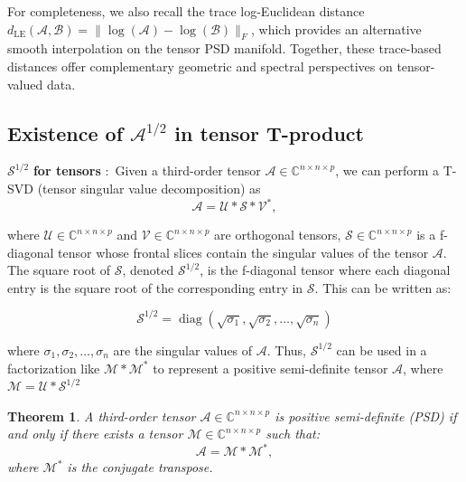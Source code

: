 \documentclass[oupthm]{CUP-JNL-BCM}%
\theoremstyle{oupplain}
\newtheorem{theorem}{Theorem}[section]
\theoremstyle{oupdefinition}
\theoremstyle{oupremark}
\theoremstyle{oupproof}
\numberwithin{equation}{section}
\begin{document}
For completeness, we also recall the trace log-Euclidean distance
$d_{\mathrm{LE}}(\mathcal{A},\mathcal{B})=\|\log(\mathcal{A})-\log(\mathcal{B})\|_F$,
which provides an alternative smooth interpolation on the tensor PSD manifold.
Together, these trace-based distances offer complementary geometric and spectral
perspectives on tensor-valued data.




\subsection{Existence of $\mathcal{A}^{1/2}$ in tensor T-product}

$\mathcal{S}^{1 / 2}$ \textbf{for tensors} \cite{ahalf}:~Given a third-order tensor $\mathcal{A} \in \mathbb{C}^{n \times n \times p}$, we can perform a T-SVD (tensor singular value decomposition) as
\begin{equation*}
    \mathcal{A}=\mathcal{U} * \mathcal{S} * \mathcal{V}^*,
\end{equation*}

\noindent where $\mathcal{U} \in \mathbb{C}^{n \times n \times p}$ and $\mathcal{V} \in \mathbb{C}^{n \times n \times p}$ are orthogonal tensors, $\mathcal{S} \in \mathbb{C}^{n \times n \times p}$ is a f-diagonal tensor whose frontal slices contain the singular values of the tensor $\mathcal{A}$.\\

\noindent The square root of $\mathcal{S}$, denoted $\mathcal{S}^{1 / 2}$, is the f-diagonal tensor where each diagonal entry is the square root of the corresponding entry in $\mathcal{S}$. This can be written as:

$$
\mathcal{S}^{1 / 2}=\operatorname{diag}\left(\sqrt{\sigma_1}, \sqrt{\sigma_2}, \ldots, \sqrt{\sigma_n}\right)
$$

\noindent where $\sigma_1, \sigma_2, \ldots, \sigma_n$ are the singular values of $\mathcal{A}$.
Thus, $\mathcal{S}^{1 / 2}$ can be used in a factorization like $\mathcal{M} * \mathcal{M}^*$ to represent a positive semi-definite tensor $\mathcal{A}$, where $\mathcal{M}=\mathcal{U} * \mathcal{S}^{1 / 2}$


\begin{theorem}
    A third-order tensor \( \mathcal{A} \in \mathbb{C}^{n \times n \times p} \) is positive semi-definite (PSD) if and only if there exists a tensor \( \mathcal{M} \in \mathbb{C}^{n \times n \times p} \) such that:
\[
\mathcal{A} = \mathcal{M} * \mathcal{M}^*,
\]
where \( \mathcal{M}^* \) is the conjugate transpose.
\end{theorem}
\end{document}
